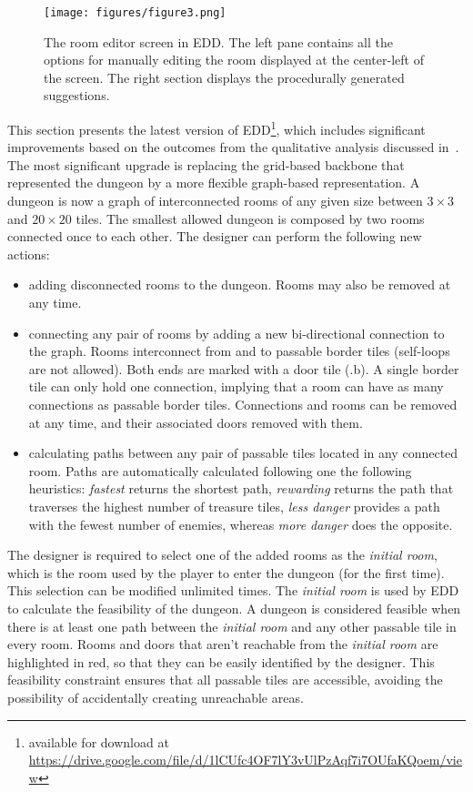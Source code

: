 \documentclass[conference]{IEEEtran}
\begin{document}
\begin{figure*}[t]
\centerline{\texttt{[image: figures/figure3.png]}}
\caption{The room editor screen in EDD. The left pane contains all the options for manually editing the room displayed at the center-left of the screen. The right section displays the procedurally generated suggestions.}
\label{figs:roomscreen}
\end{figure*}

This section presents the latest version of EDD\footnote{available for download at \url{https://drive.google.com/file/d/1lCUfc4OF7lY3vUlPzAqf7i7OUfaKQoem/view}}, which includes significant improvements based on the outcomes from the qualitative analysis discussed in~\cite{Alvarez2018}. The most significant upgrade is replacing the grid-based backbone that represented the dungeon by a more flexible graph-based representation. A dungeon is now a graph of interconnected rooms of any given size between $3\times3$ and $20\times20$ tiles. The smallest allowed dungeon is composed by two rooms connected once to each other. The designer can perform the following new actions: 

\begin{itemize}
\item adding disconnected rooms to the dungeon. Rooms may also be removed at any time.
\item connecting any pair of rooms by adding a new bi-directional connection to the graph. Rooms interconnect from and to passable border tiles (self-loops are not allowed). Both ends are marked with a door tile (.b). A single border tile can only hold one connection, implying that a room can have as many connections as passable border tiles. Connections and rooms can be removed at any time, and their associated doors removed with them.%
\item calculating paths between any pair of passable tiles located in any connected room. Paths are automatically calculated following one the following heuristics: \textit{fastest} returns the shortest path, \textit{rewarding} returns the path that traverses the highest number of treasure tiles, \textit{less danger} provides a path with the fewest number of enemies, whereas \textit{more danger} does the opposite. 
\end{itemize}

The designer is required to select one of the added rooms as the \textit{initial room}, which is the room used by the player to enter the dungeon (for the first time). This selection can be modified unlimited times. The \textit{initial room} is used by EDD to calculate the feasibility of the dungeon. A dungeon is considered feasible when there is at least one path between the \textit{initial room} and any other passable tile in every room. Rooms and doors that aren't reachable from the \textit{initial room} are highlighted in red, so that they can be easily identified by the designer. This feasibility constraint ensures that all passable tiles are accessible, avoiding the possibility of accidentally creating unreachable areas.  
\end{document}
